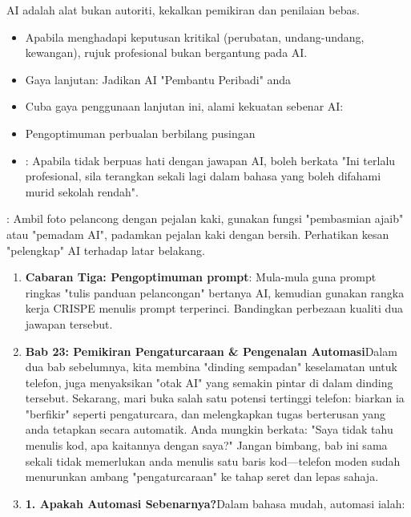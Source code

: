 \begin{tcbinfo}{AI adalah alat bukan autoriti, kekalkan pemikiran dan penilaian bebas.}
\begin{itemize}
  \item Apabila menghadapi keputusan kritikal (perubatan, undang-undang, kewangan), rujuk profesional bukan bergantung pada AI.
  \item Gaya lanjutan: Jadikan AI "Pembantu Peribadi" anda
  \item Cuba gaya penggunaan lanjutan ini, alami kekuatan sebenar AI:
  \item Pengoptimuman perbualan berbilang pusingan
  \item : Apabila tidak berpuas hati dengan jawapan AI, boleh berkata "Ini terlalu profesional, sila terangkan sekali lagi dalam bahasa yang boleh difahami murid sekolah rendah".
\end{itemize}

\end{tcbinfo}

\begin{tcbpractice}{: Ambil foto pelancong dengan pejalan kaki, gunakan fungsi "pembasmian ajaib" atau "pemadam AI", padamkan pejalan kaki dengan bersih. Perhatikan kesan "pelengkap" AI terhadap latar belakang.}
\begin{enumerate}
  \item \textbf{Cabaran Tiga: Pengoptimuman prompt}: Mula-mula guna prompt ringkas "tulis panduan pelancongan" bertanya AI, kemudian gunakan rangka kerja CRISPE menulis prompt terperinci. Bandingkan perbezaan kualiti dua jawapan tersebut.
  \item \textbf{Bab 23: Pemikiran Pengaturcaraan \& Pengenalan Automasi}Dalam dua bab sebelumnya, kita membina "dinding sempadan" keselamatan untuk telefon, juga menyaksikan "otak AI" yang semakin pintar di dalam dinding tersebut. Sekarang, mari buka salah satu potensi tertinggi telefon: biarkan ia "berfikir" seperti pengaturcara, dan melengkapkan tugas berterusan yang anda tetapkan secara automatik. Anda mungkin berkata: "Saya tidak tahu menulis kod, apa kaitannya dengan saya?" Jangan bimbang, bab ini sama sekali tidak memerlukan anda menulis satu baris kod—telefon moden sudah menurunkan ambang "pengaturcaraan" ke tahap seret dan lepas sahaja.
  \item \textbf{1. Apakah Automasi Sebenarnya?}Dalam bahasa mudah, automasi ialah:
\end{enumerate}

\end{tcbpractice}

